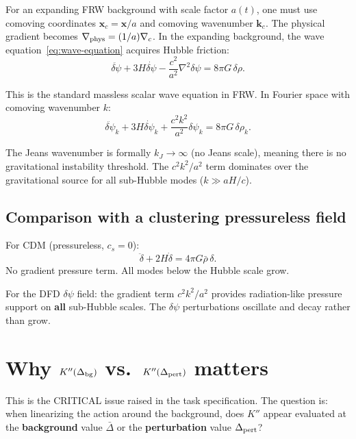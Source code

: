 \documentclass[aps,prd,twocolumn,nofootinbib]{revtex4-2}
\newcommand{\dpsi}{\delta\psi}
\begin{document}
For an expanding FRW background with scale factor $a(t)$, one must
use comoving coordinates $\mathbf{x}_c = \mathbf{x}/a$ and comoving
wavenumber $\mathbf{k}_c$. The physical gradient becomes
$\nabla_{\rm phys} = (1/a)\nabla_c$. In the expanding background,
the wave equation~\eqref{eq:wave-equation} acquires Hubble friction:
\begin{equation}
\boxed{
\ddot{\dpsi} + 3H\dot{\dpsi} - \frac{c^2}{a^2}\nabla^2\dpsi
= 8\pi G\,\delta\rho.
}
\label{eq:wave-FRW}
\end{equation}

This is the standard massless scalar wave equation in FRW. In Fourier
space with comoving wavenumber $k$:
\begin{equation}
\ddot{\dpsi}_k + 3H\dot{\dpsi}_k + \frac{c^2 k^2}{a^2}\dpsi_k
= 8\pi G\,\delta\rho_k.
\label{eq:fourier-FRW}
\end{equation}

The Jeans wavenumber is formally $k_J \to \infty$ (no Jeans scale),
meaning there is no gravitational instability threshold. The $c^2 k^2/a^2$
term dominates over the gravitational source for all sub-Hubble modes
($k \gg aH/c$).

\subsection{Comparison with a clustering pressureless field}

For CDM (pressureless, $c_s = 0$):
\begin{equation}
\ddot\delta + 2H\dot\delta = 4\pi G\bar\rho\,\delta.
\end{equation}
No gradient pressure term. All modes below the Hubble scale grow.

For the DFD $\dpsi$ field: the gradient term $c^2 k^2/a^2$ provides
radiation-like pressure support on \textbf{all} sub-Hubble scales.
The $\dpsi$ perturbations oscillate and decay rather than grow.

\section{Why $K''(\Delta_{\rm bg})$ vs.\ $K''(\Delta_{\rm pert})$ matters}
\label{sec:Kpp-question}

This is the CRITICAL issue raised in the task specification. The question
is: when linearizing the action around the background, does $K''$ appear
evaluated at the \textbf{background} value $\bar\Delta$ or the
\textbf{perturbation} value $\Delta_{\rm pert}$?
\end{document}
